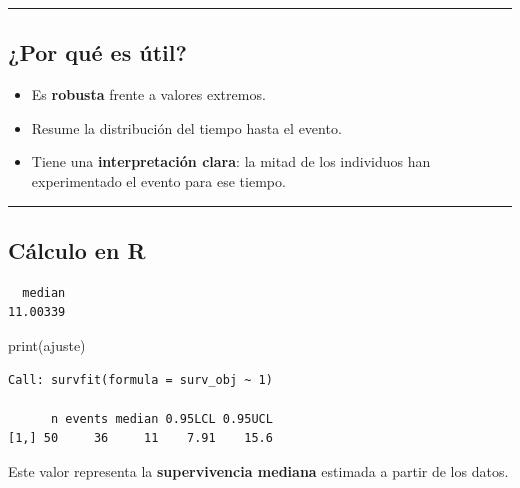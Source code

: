 \documentclass[
]{article}
\newenvironment{Shaded}{\begin{snugshade}}{\end{snugshade}}
\newcommand{\FunctionTok}[1]{\textcolor[rgb]{0.28,0.35,0.67}{#1}}
\newcommand{\NormalTok}[1]{\textcolor[rgb]{0.00,0.23,0.31}{#1}}
\newcommand{\SpecialCharTok}[1]{\textcolor[rgb]{0.37,0.37,0.37}{#1}}
\newcommand{\StringTok}[1]{\textcolor[rgb]{0.13,0.47,0.30}{#1}}
\providecommand{\tightlist}{%
  \setlength{\itemsep}{0pt}\setlength{\parskip}{0pt}}
\begin{document}
\begin{center}\rule{0.5\linewidth}{0.5pt}\end{center}

\subsection{¿Por qué es útil?}\label{por-quuxe9-es-uxfatil}

\begin{itemize}
\tightlist
\item
  Es \textbf{robusta} frente a valores extremos.
\item
  Resume la distribución del tiempo hasta el evento.
\item
  Tiene una \textbf{interpretación clara}: la mitad de los individuos
  han experimentado el evento para ese tiempo.
\end{itemize}

\begin{center}\rule{0.5\linewidth}{0.5pt}\end{center}

\subsection{Cálculo en R}\label{cuxe1lculo-en-r}

\begin{Shaded}
\end{Shaded}

\begin{verbatim}
  median 
11.00339 
\end{verbatim}

\begin{Shaded}
\begin{Highlighting}[]
\FunctionTok{print}\NormalTok{(ajuste)}
\end{Highlighting}
\end{Shaded}

\begin{verbatim}
Call: survfit(formula = surv_obj ~ 1)

      n events median 0.95LCL 0.95UCL
[1,] 50     36     11    7.91    15.6
\end{verbatim}

Este valor representa la \textbf{supervivencia mediana} estimada a
partir de los datos.
\end{document}
